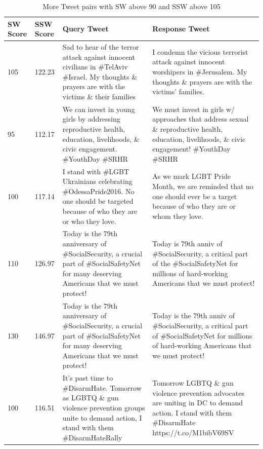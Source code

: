 \documentclass[11pt]{article}
\begin{document}
\begin{flushleft}
\begin{table}[]
\tiny
\centering
\caption{More Tweet pairs with SW above 90 and SSW above 105}
\label{tbl:diff2}
\begin{tabular}{|p{}|p{}|p{}|p{}|}
\hline
SW Score & SSW Score & Query Tweet                                                                                                                                              & Response Tweet                                                                                                                                            \\ \hline
105      & 122.23    & Sad to hear of the terror attack against innocent civilians in \#TelAviv \#Israel. My thoughts \& prayers are with the victims \& their families & I condemn the vicious terrorist attack against innocent worshipers in \#Jerusalem. My thoughts \& prayers are with the victims' families.             \\ \hline
95       & 112.17    & We can invest in young girls by addressing reproductive health, education, livelihoods, \& civic engagement. \#YouthDay \#SRHR                       & We must invest in girls w/ approaches that address sexual \& reproductive health, education, livelihoods, \& civic engagement! \#YouthDay \#SRHR  \\ \hline
100      & 117.14    & I stand with \#LGBT Ukrainians celebrating \#OdessaPride2016. No one should be targeted because of who they are or who they love.                        & As we mark LGBT Pride Month, we are reminded that no one should ever be a target because of who they are or whom they love.                               \\ \hline
110      & 126.97    & Today is the 79th anniversary of \#SocialSecurity, a crucial part of \#SocialSafetyNet for many deserving Americans that we must protect!                & Today is 79th anniv of \#SocialSecurity, a critical part of the \#SocialSafetyNet for millions of hard-working Americans that we must protect!            \\ \hline
130      & 146.97    & Today is the 79th anniversary of \#SocialSecurity, a crucial part of \#SocialSafetyNet for many deserving Americans that we must protect!                & Today is the 79th anniv of \#SocialSecurity, a critical part of \#SocialSafetyNet for millions of hard-working Americans that we must protect!            \\ \hline
100      & 116.51    & It's past time to \#DisarmHate. Tomorrow as LGBTQ \& gun violence prevention groups unite to demand action, I stand with them \#DisarmHateRally      & Tomorrow LGBTQ \& gun violence prevention advocates are uniting in DC to demand action. I stand with them \#DisarmHate https://t.co/M1bibV69SV        \\ \hline

\end{tabular}
\end{table}
\end{flushleft}
\end{document}
